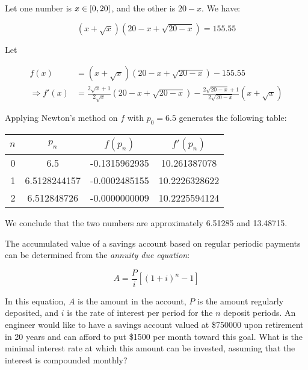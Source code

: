 \documentclass[../../../../Assignments]{subfiles}
\begin{document}
\begin{solution}
    Let one number is \(x \in \interval{0}{20}\), and the other is \(20 - x\).
    We have:

    \[(x + \sqrt{x}) (20 - x + \sqrt{20 - x}) = \num{155.55}\]

    Let

    \begin{align*}
                     f(x) &= (x + \sqrt{x}) (20 - x + \sqrt{20 - x}) - \num{155.55} \\
        \Rightarrow f'(x) &= \frac{2 \sqrt{x} + 1}{2 \sqrt{x}} (20 - x + \sqrt{20 - x}) - \frac{2 \sqrt{20 - x} + 1}{2 \sqrt{20 - x}} (x + \sqrt{x})
    \end{align*}

    Applying Newton's method on \(f\) with \(p_0 = \num{6.5}\) generates the
    following table:

    \begin{table}[H]
        \centering
        \begin{tabular}{r S[table-format=1.10] S[table-format=-1.10] S[table-format=2.10]}
            \toprule
            \(n\)  &    {\(p_n\)}   &   {\(f(p_n)\)}  &  {\(f'(p_n)\)}  \\
              &  6.5           &  -0.1315962935  &  10.261387078   \\
                1  &  6.5128244157  &  -0.0002485155  &  10.2226328622  \\
                2  &  6.512848726   &  -0.0000000009  &  10.2225594124  \\
            \bottomrule
        \end{tabular}
    \end{table}

    We conclude that the two numbers are approximately \num{6.51285} and
    \num{13.48715}.
\end{solution}

\begin{exercise}
    The accumulated value of a savings account based on regular periodic
    payments can be determined from the \emph{annuity due equation}:

    \[A = \frac{P}{i} [(1 + i)^n - 1]\]

    In this equation, \(A\) is the amount in the account, \(P\) is the amount
    regularly deposited, and \(i\) is the rate of interest per period for the
    \(n\) deposit periods. An engineer would like to have a savings account
    valued at \$\num{750000} upon retirement in 20 years and can afford to put
    \$\num{1500} per month toward this goal. What is the minimal interest rate
    at which this amount can be invested, assuming that the interest is
    compounded monthly?
\end{exercise}
\end{document}
